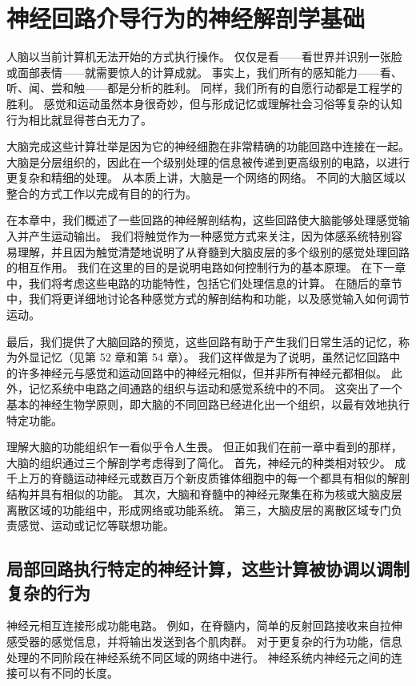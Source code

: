 \chapter{神经回路介导行为的神经解剖学基础}
人脑以当前计算机无法开始的方式执行操作。 仅仅是看——看世界并识别一张脸或面部表情——就需要惊人的计算成就。 事实上，我们所有的感知能力——看、听、闻、尝和触——都是分析的胜利。 同样，我们所有的自愿行动都是工程学的胜利。 感觉和运动虽然本身很奇妙，但与形成记忆或理解社会习俗等复杂的认知行为相比就显得苍白无力了。

大脑完成这些计算壮举是因为它的神经细胞在非常精确的功能回路中连接在一起。 大脑是分层组织的，因此在一个级别处理的信息被传递到更高级别的电路，以进行更复杂和精细的处理。 从本质上讲，大脑是一个网络的网络。 不同的大脑区域以整合的方式工作以完成有目的的行为。

在本章中，我们概述了一些回路的神经解剖结构，这些回路使大脑能够处理感觉输入并产生运动输出。 我们将触觉作为一种感觉方式来关注，因为体感系统特别容易理解，并且因为触觉清楚地说明了从脊髓到大脑皮层的多个级别的感觉处理回路的相互作用。 我们在这里的目的是说明电路如何控制行为的基本原理。 在下一章中，我们将考虑这些电路的功能特性，包括它们处理信息的计算。 在随后的章节中，我们将更详细地讨论各种感觉方式的解剖结构和功能，以及感觉输入如何调节运动。

最后，我们提供了大脑回路的预览，这些回路有助于产生我们日常生活的记忆，称为外显记忆（见第 52 章和第 54 章）。 我们这样做是为了说明，虽然记忆回路中的许多神经元与感觉和运动回路中的神经元相似，但并非所有神经元都相似。 此外，记忆系统中电路之间通路的组织与运动和感觉系统中的不同。 这突出了一个基本的神经生物学原则，即大脑的不同回路已经进化出一个组织，以最有效地执行特定功能。

理解大脑的功能组织乍一看似乎令人生畏。 但正如我们在前一章中看到的那样，大脑的组织通过三个解剖学考虑得到了简化。 首先，神经元的种类相对较少。 成千上万的脊髓运动神经元或数百万个新皮质锥体细胞中的每一个都具有相似的解剖结构并具有相似的功能。 其次，大脑和脊髓中的神经元聚集在称为核或大脑皮层离散区域的功能组中，形成网络或功能系统。 第三，大脑皮层的离散区域专门负责感觉、运动或记忆等联想功能。

\section{局部回路执行特定的神经计算，这些计算被协调以调制复杂的行为}

神经元相互连接形成功能电路。 例如，在脊髓内，简单的反射回路接收来自拉伸感受器的感觉信息，并将输出发送到各个肌肉群。 对于更复杂的行为功能，信息处理的不同阶段在神经系统不同区域的网络中进行。 神经系统内神经元之间的连接可以有不同的长度。

